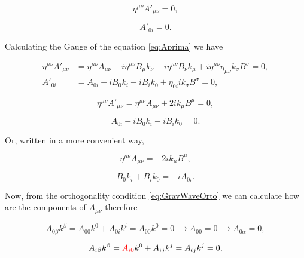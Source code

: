         \begin{equation}
            \eta^{\mu\nu}A'_{\mu\nu}=0,
        \end{equation}

        \begin{equation}
            A'_{0i} = 0.
        \end{equation}

        Calculating the Gauge of the equation \ref{eq:Aprima} we have

        \begin{align}
            \eta^{\mu\nu}A'_{\mu\nu} &= \eta^{\mu\nu}A_{\mu\nu} - i \eta^{\mu\nu}B_{\mu}k_{\nu} - i\eta^{\mu\nu}B_{\nu}k_{\mu} + i \eta^{\mu\nu}\eta_{\mu\nu}k_{\sigma}B^{\sigma}=0,\\
            A'_{0i} &= A_{0i} - iB_0k_i - iB_ik_0 + \eta_{0i} ik_{\sigma}B^{\sigma} = 0,
        \end{align}

        \begin{equation}
            \eta^{\mu\nu}A'_{\mu\nu} = \eta^{\mu\nu}A_{\mu\nu} + 2ik_{\mu}B^{\mu}=0,
        \end{equation}

        \begin{equation}
            A_{0i} - iB_0k_i - iB_ik_0=0.
        \end{equation}

        Or, written in a more convenient way,

        \begin{equation}
            \eta^{\mu\nu}A_{\mu\nu}=-2ik_{\mu}B^{\mu},
        \end{equation}

        \begin{equation}
            B_0k_i + B_ik_0 = -iA_{0i}.
        \end{equation}

        Now, from the orthogonality condition \ref{eq:GravWaveOrto} we can calculate how are the components of $A_{\mu\nu}$ therefore

        \begin{equation}
            A_{0\beta}k^{\beta} = A_{00}k^0 + A_{0i}k^i = A_{00}k^0=0 \;\rightarrow A_{00}=0 \;\rightarrow A_{0\alpha}=0,
        \end{equation}

        \begin{equation}
            A_{i\beta}k^{\beta}={\color{red}A_{i0}}k^0 + A_{ij}k^j= A_{ij}k^j = 0,
        \end{equation}

